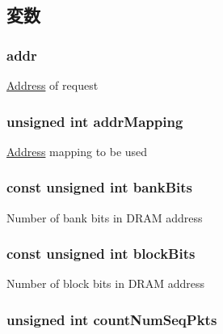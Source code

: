 \subsection{変数}
\hypertarget{classDramGen_a0bb77b4ba61e408313e1118250f9278c}{
\subsubsection[{addr}]{ {\bf addr}}}
\label{classDramGen_a0bb77b4ba61e408313e1118250f9278c}
\hyperlink{classAddress}{Address} of request \hypertarget{classDramGen_ad03c09dad8f497cd0d9fb1a58500acab}{
\subsubsection[{addrMapping}]{\setlength{\rightskip}{0pt plus 5cm}unsigned int {\bf addrMapping}}}
\label{classDramGen_ad03c09dad8f497cd0d9fb1a58500acab}
\hyperlink{classAddress}{Address} mapping to be used \hypertarget{classDramGen_a501bda29f816788d3bba6d280d6fdc94}{
\subsubsection[{bankBits}]{\setlength{\rightskip}{0pt plus 5cm}const unsigned int {\bf bankBits}}}
\label{classDramGen_a501bda29f816788d3bba6d280d6fdc94}
Number of bank bits in DRAM address \hypertarget{classDramGen_a5f384954184da222f096688b1a3cc7a5}{
\subsubsection[{blockBits}]{\setlength{\rightskip}{0pt plus 5cm}const unsigned int {\bf blockBits}}}
\label{classDramGen_a5f384954184da222f096688b1a3cc7a5}
Number of block bits in DRAM address \hypertarget{classDramGen_afe76fc6f68d7bc6df6e5757cbc74d949}{
\subsubsection[{countNumSeqPkts}]{\setlength{\rightskip}{0pt plus 5cm}unsigned int {\bf countNumSeqPkts}}}
